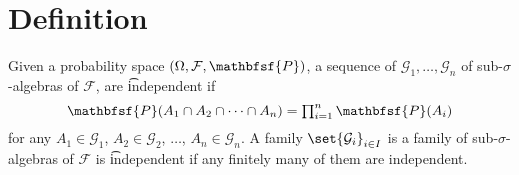 
\section*{Definition}

Given a probability space $(\Omega , \mathcal{F} , \mathbfsf{P} )$, a sequence of $\mathcal{G} _1, \dots , \mathcal{G} _n$ of sub-$\sigma $-algebras of $\mathcal{F} $, are \t{independent} if
\[
\textstyle
\mathbfsf{P} (A_1 \cap  A_2 \cap  \cdots \cap  A_n) = \prod_{i = 1}^{n} \mathbfsf{P} (A_i)
\]
for any $A_1 \in \mathcal{G} _1$, $A_2 \in \mathcal{G} _2$, $\dots $, $A_n \in \mathcal{G} _n$.
A family $\set{\mathcal{G} _i}_{i \in I}$ is a family of sub-$\sigma $-algebras of $\mathcal{F} $ is \t{independent} if any finitely many of them are independent.

\blankpage
